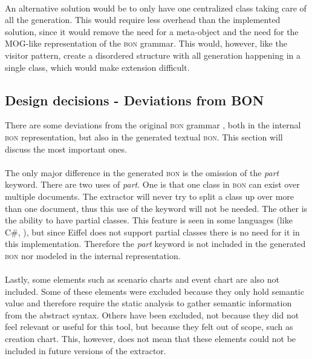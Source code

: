 \paragraph{}
An alternative solution would be to only have one centralized class taking care of all the generation. This would require less overhead than the implemented solution, since it would remove the need for a meta-object and the need for the MOG-like representation of the \textsc{bon} grammar. This would, however, like the visitor pattern, create a disordered structure with all generation happening in a single class, which would make extension difficult.

\subsection{Design decisions - Deviations from BON}
\label{deviations_from_bon}There are some deviations from the original \textsc{bon} grammar \cite[pp.~352-359]{walden1995}, both in the internal \textsc{bon} representation, but also in the generated textual \textsc{bon}. This section will discuss the most important ones. 

\paragraph{}
The only major difference in the generated \textsc{bon} is the omission of the \textit{part} keyword. There are two uses of \textit{part}. One is that one class in \textsc{bon} can exist over multiple documents. The extractor will never try to split a class up over more than one document, thus this use of the keyword will not be needed. The other is the ability to have partial classes. This feature is seen in some languages (like C\#, \cite{msdn2009}), but since Eiffel does not support partial classes there is no need for it in this implementation. Therefore the \textit{part} keyword is not included in the generated \textsc{bon} nor modeled in the internal representation.

\paragraph{}
Lastly, some elements such as scenario charts and event chart are also not included. Some of these elements were excluded because they only hold semantic value and therefore require the static analysis to gather semantic information from the abstract syntax. Others have been excluded, not because they did not feel relevant or useful for this tool, but because they felt out of scope, such as creation chart. This, however, does not mean that these elements could not be included in future versions of the extractor.
